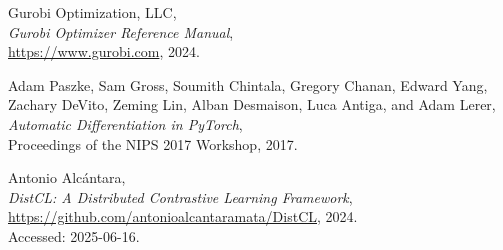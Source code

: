\documentclass[preprint,12pt]{elsarticle}
\begin{document}
\begin{thebibliography}{00}
Gurobi Optimization, LLC,\\
\textit{Gurobi Optimizer Reference Manual},\\
\url{https://www.gurobi.com}, 2024.


Adam Paszke, Sam Gross, Soumith Chintala, Gregory Chanan, Edward Yang, Zachary DeVito, Zeming Lin, Alban Desmaison, Luca Antiga, and Adam Lerer,\\
\textit{Automatic Differentiation in PyTorch},\\
Proceedings of the NIPS 2017 Workshop, 2017.

Antonio Alcántara,\\
\textit{DistCL: A Distributed Contrastive Learning Framework},\\
\url{https://github.com/antonioalcantaramata/DistCL}, 2024.\\
Accessed: 2025-06-16.


\end{thebibliography}
\end{document}
